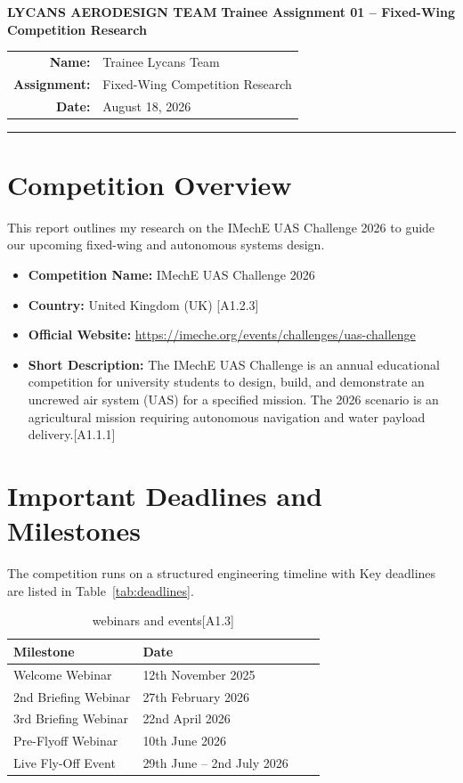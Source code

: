 \documentclass[11pt,a4paper]{article}
\begin{document}
\begin{center}
{\Large\bfseries\color{LycansBlue}
LYCANS AERODESIGN TEAM}
\vspace{0.5cm}
{\LARGE\bfseries
Trainee Assignment 01 -- Fixed-Wing Competition Research}
\vspace{0.5cm}
\begin{tabular}{rl}
\textbf{Name:} & Trainee Lycans Team \\
\textbf{Assignment:} & Fixed-Wing Competition Research \\
\textbf{Date:} & August 18, 2026
\end{tabular}
\end{center}
\vspace{0.5cm}
\hrule
\vspace{0.5cm}

\section{Competition Overview}
This report outlines my research on the IMechE UAS Challenge 2026 to guide our upcoming fixed-wing and autonomous systems design.

\begin{itemize}
    \item \textbf{Competition Name:} IMechE UAS Challenge 2026 
    \item \textbf{Country:} United Kingdom (UK) [A1.2.3]
    \item \textbf{Official Website:} \url{https://imeche.org/events/challenges/uas-challenge} 
    \item \textbf{Short Description:}
    The IMechE UAS Challenge is an annual educational competition for university students to design, build, and demonstrate an uncrewed air system (UAS) for a specified mission. The 2026 scenario is an agricultural mission requiring autonomous navigation and water payload delivery.[A1.1.1]

    
\end{itemize}

\section{Important Deadlines and Milestones}
The competition runs on a structured engineering timeline with  Key deadlines are listed in Table~\ref{tab:deadlines}.

\begin{table}[H]
\centering
\caption{webinars and events[A1.3]}
\label{tab:webinars}
\begin{tabular}{lllc}
\toprule
\textbf{Milestone} & \textbf{Date} \\
\midrule
Welcome Webinar & 12th November 2025\\
2nd Briefing Webinar & 27th February 2026 \\
3rd Briefing Webinar& 22nd April 2026 \\
Pre-Flyoff Webinar & 10th June 2026\\
Live Fly-Off Event & 29th June -- 2nd July 2026  \\

\bottomrule
\end{tabular}
\end{table}
\end{document}
